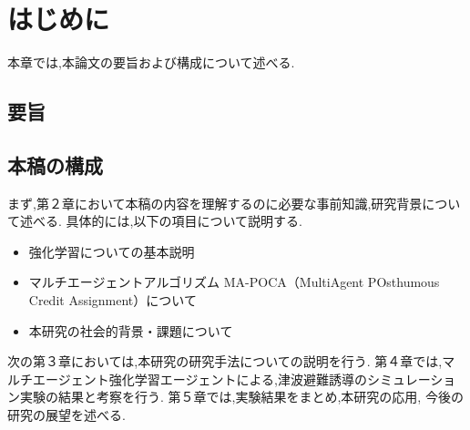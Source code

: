 \chapter{はじめに}
本章では,本論文の要旨および構成について述べる.
\section{要旨}
\section{本稿の構成}
まず,第２章において本稿の内容を理解するのに必要な事前知識,研究背景について述べる.
具体的には,以下の項目について説明する.
\begin{itemize}
  \item 強化学習についての基本説明
  \item マルチエージェントアルゴリズム MA-POCA（MultiAgent POsthumous Credit Assignment）について
  \item 本研究の社会的背景・課題について
\end{itemize}

次の第３章においては,本研究の研究手法についての説明を行う.
第４章では,マルチエージェント強化学習エージェントによる,津波避難誘導のシミュレーション実験の結果と考察を行う.
第５章では,実験結果をまとめ,本研究の応用, 今後の研究の展望を述べる.
